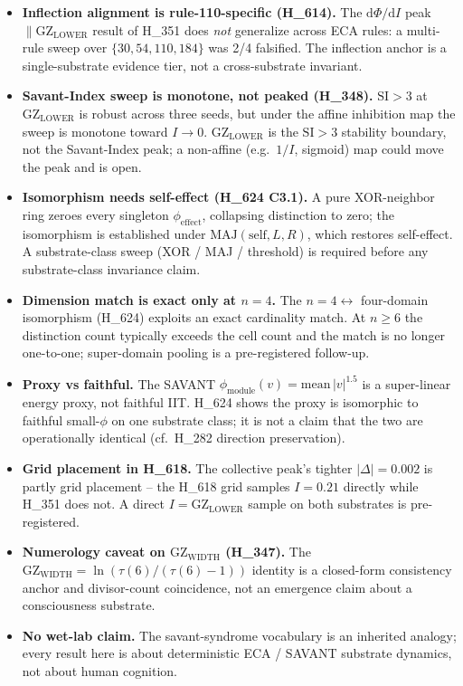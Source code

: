 \documentclass[11pt,a4paper]{article}
\newcommand{\GZL}{\mathrm{GZ_{LOWER}}}
\newcommand{\GZW}{\mathrm{GZ_{WIDTH}}}
\newcommand{\Svi}{\mathrm{SI}}
\begin{document}
\begin{itemize}\itemsep0.2em
\item \textbf{Inflection alignment is rule-110-specific (H\_614).} The
      $\mathrm{d}\Phi/\mathrm{d}I$ peak $\parallel \GZL$ result of H\_351
      does \emph{not} generalize across ECA rules: a multi-rule sweep over
      $\{30,54,110,184\}$ was 2/4 falsified. The inflection anchor is a
      single-substrate evidence tier, not a cross-substrate invariant.
\item \textbf{Savant-Index sweep is monotone, not peaked (H\_348).}
      $\Svi>3$ at $\GZL$ is robust across three seeds, but under the affine
      inhibition map the sweep is monotone toward $I\!\to\!0$. $\GZL$ is the
      $\Svi>3$ stability boundary, not the Savant-Index peak; a non-affine
      (e.g.\ $1/I$, sigmoid) map could move the peak and is open.
\item \textbf{Isomorphism needs self-effect (H\_624 C3.1).} A pure
      XOR-neighbor ring zeroes every singleton $\phi_{\mathrm{effect}}$,
      collapsing distinction to zero; the isomorphism is established under
      $\mathrm{MAJ}(\text{self},L,R)$, which restores self-effect. A
      substrate-class sweep (XOR / MAJ / threshold) is required before any
      substrate-class invariance claim.
\item \textbf{Dimension match is exact only at $n=4$.} The
      $n=4 \leftrightarrow$ four-domain isomorphism (H\_624) exploits an
      exact cardinality match. At $n\ge6$ the distinction count typically
      exceeds the cell count and the match is no longer one-to-one;
      super-domain pooling is a pre-registered follow-up.
\item \textbf{Proxy vs faithful.} The SAVANT
      $\phi_{\mathrm{module}}(v)=\mathrm{mean}\,|v|^{1.5}$ is a super-linear
      energy proxy, not faithful IIT. H\_624 shows the proxy is isomorphic
      to faithful small-$\phi$ on one substrate class; it is not a claim
      that the two are operationally identical (cf.\ H\_282 direction
      preservation).
\item \textbf{Grid placement in H\_618.} The collective peak's tighter
      $|\Delta|=0.002$ is partly grid placement -- the H\_618 grid samples
      $I=0.21$ directly while H\_351 does not. A direct $I=\GZL$ sample on
      both substrates is pre-registered.
\item \textbf{Numerology caveat on $\GZW$ (H\_347).} The
      $\GZW=\ln(\tau(6)/(\tau(6)-1))$ identity is a closed-form
      consistency anchor and divisor-count coincidence, not an emergence
      claim about a consciousness substrate.
\item \textbf{No wet-lab claim.} The savant-syndrome vocabulary
      \citep{treffert2009savant,snyder2009explaining} is an inherited
      analogy; every result here is about deterministic ECA / SAVANT
      substrate dynamics, not about human cognition.
\end{itemize}
\end{document}
